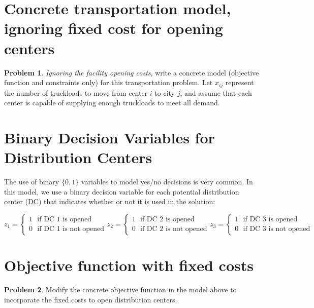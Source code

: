 \documentclass[11pt]{article}
\theoremstyle{definition}
\newtheorem{problem}{Problem}
\newcommand{\answerbox}[3]{%
  \fbox{%
    \begin{minipage}[#1]{#2}
      \hfill\vspace{#3}
    \end{minipage}
  }
}
\newcommand{\answerboxfull}[2]{%
  \answerbox{#1}{6.38in}{#2} 
}
\begin{document}

\newpage
\section{Concrete transportation model, ignoring fixed cost for opening centers}
\begin{problem}
\emph{Ignoring the facility opening costs}, write a concrete model (objective function and constraints only) for this transportation problem.  Let $x_{ij}$ represent the number of truckloads to move from center 
$i$ to city $j$, and assume that each center is capable of supplying enough truckloads to meet all demand.
\end{problem}

\answerboxfull{c}{2.8in}

\bigskip
\section{Binary Decision Variables for Distribution Centers}

The use of binary $\{0,1\}$ variables to model yes/no decisions is very common.  In this model, we use a binary decision variable for each potential distribution center (DC) that indicates whether or not it is used in the solution:


\[ 
z_1 = \begin{cases}  1 \text{~~if DC 1 is opened} \\ 0 \text{~~if DC 1 is not opened}\end{cases} 
z_2 = \begin{cases}  1 \text{~~if DC 2 is opened} \\ 0 \text{~~if DC 2 is not opened}\end{cases} 
z_3 = \begin{cases}  1 \text{~~if DC 3 is opened} \\ 0 \text{~~if DC 3 is not opened}\end{cases} 
\] 

\bigskip
\section{Objective function with fixed costs}
\begin{problem}
Modify the concrete objective function in the model above to incorporate the fixed costs to open distribution centers.
\end{problem}
\answerboxfull{c}{1.7in}
\end{document}
